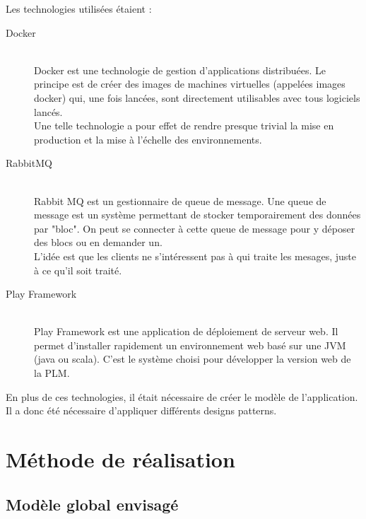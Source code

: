 \documentclass[stage]{tnreport}
\begin{document}
Les technologies utilisées étaient :
\begin{description}
	\item[Docker] \hfill \\
		Docker est une technologie de gestion d'applications distribuées. Le principe est de créer des images de machines virtuelles (appelées images docker) qui, une fois lancées, sont directement utilisables avec tous logiciels lancés. \\
		Une telle technologie a pour effet de rendre presque trivial la mise en production et la mise à l'échelle des environnements.
	\item[RabbitMQ] \hfill \\
		Rabbit MQ\cite{RMQ-WS} est un gestionnaire de queue de message. Une queue de message est un  système permettant de stocker temporairement des données par "bloc". On peut se connecter à cette queue de message pour y déposer des blocs ou en demander un. \\
		L'idée est que les clients ne s'intéressent pas à qui traite les mesages, juste à ce qu'il soit traité.
	\item[Play Framework] \hfill \\
		Play Framework\cite{PFM-WS} est une application de déploiement de serveur web. Il permet d'installer rapidement un environnement web basé sur une JVM (java ou scala). C'est le système choisi pour développer la version web de la PLM.
\end{description}

En plus de ces technologies, il était nécessaire de créer le modèle de l'application. Il a donc été nécessaire d'appliquer différents designs patterns.

\section{Méthode de réalisation}

\subsection{Modèle global envisagé}
\end{document}
